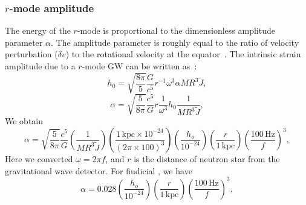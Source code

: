 \documentclass{ttuthes2007}
\begin{document}
\subsubsection{$r$-mode amplitude}
The energy of the $r$-mode is proportional to the dimensionless amplitude
parameter $\alpha$. The amplitude parameter is roughly equal to the ratio of
velocity perturbation ($\delta v$) to the rotational velocity at the
equator~\cite{Ian}. The
intrinsic strain amplitude due to a $r$-mode \ac{GW} can be written
as~\cite{Owen_2010}:
\begin{equation*}                                                               
h_0 =\sqrt{\frac{8\pi}{5}}\frac{G}{c^5}r^{-1}\omega^3 \alpha M R^3 \tilde{J},      
\end{equation*}                                                                 
\begin{equation*}                                                               
\alpha = \sqrt{\frac{5}{8\pi}}\frac{c^5}{G} r \frac{1}{\omega^3} h_0 \frac{1}{M   
R^3 \tilde{J}},                                                                  
\end{equation*}
We obtain                                                                 
\begin{equation*}                                                               
\alpha=\sqrt{\frac{5}{8\pi}}\frac{c^5}{G}\left(\frac{1}{M                       
R^3 \tilde{J}}\right)\left(\frac{1\,\mathrm{kpc}\times 10^{-24}}{(2\pi \times
100)^3}\right)
\left(\frac{h_o}{10^{-24}}\right)\left(\frac{r}{1\,\mathrm{kpc}}\right)\left(\frac{100\,\mathrm{Hz}}{f}\right)^3,
\end{equation*}                                                                 
Here we converted $\omega=2\pi f$, and $r$ is the distance of neutron star from
the gravitational wave detector. For fiudicial , we have                         
\begin{equation} 
\alpha
=0.028\left(\frac{h_o}{10^{-24}}\right)\left(\frac{r}{1\,\mathrm{kpc}}\right)\left(\frac{100\,\mathrm{Hz}}{f}\right)^3,
\end{equation}           
\end{document}
